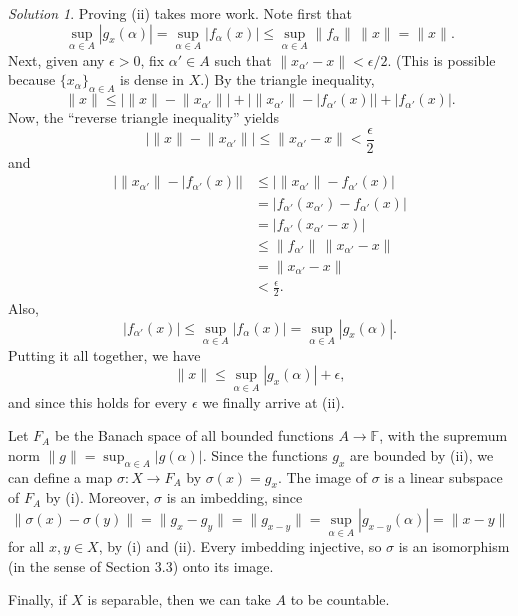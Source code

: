 \documentclass{report}
\newcommand{\bb}[1]{\mathbb{#1}}
\newcommand{\norm}[1]{{\lVert #1 \rVert}}
\theoremstyle{remark}
\newtheorem*{solution}{Solution}
\begin{document}
\begin{solution}
  Proving (ii) takes more work. Note first that
  \begin{equation*}
    \sup_{\alpha \in A} |g_x(\alpha)| = \sup_{\alpha \in A} |f_\alpha(x)| \le \sup_{\alpha \in A} \norm{f_\alpha} \, \norm x = \norm x.
  \end{equation*}
  Next, given any $\epsilon > 0$, fix $\alpha' \in A$ such that $\norm{x_{\alpha'} - x} < \epsilon/2$. (This is possible because $\{x_\alpha\}_{\alpha \in A}$ is dense in $X$.) By the triangle inequality,
  \begin{equation*}
    \norm x \le \big| \norm x - \norm{x_{\alpha'}} \big| + \big| \norm{x_{\alpha'}} - |f_{\alpha'}(x)| \big| + |f_{\alpha'}(x)|.
  \end{equation*}
  Now, the ``reverse triangle inequality'' yields
  \begin{equation*}
    \big| \norm x - \norm{x_{\alpha'}} \big| \le \norm{x_{\alpha'} - x} < \frac{\epsilon}{2}
  \end{equation*}
  and
  \begin{equation*}
    \begin{split}
      \big| \norm{x_{\alpha'}} - |f_{\alpha'}(x)| \big| &\le \big| \norm{x_{\alpha'}} - f_{\alpha'}(x) \big| \\
      &= |f_{\alpha'}(x_{\alpha'}) - f_{\alpha'}(x)| \\
      &= |f_{\alpha'}(x_{\alpha'} - x)| \\
      &\le \norm{f_{\alpha'}} \, \norm{x_{\alpha'} - x} \\
      &= \norm{x_{\alpha'} - x} \\
      &< \frac{\epsilon}{2}.
    \end{split}
  \end{equation*}
  Also,
  \begin{equation*}
    |f_{\alpha'}(x)| \le \sup_{\alpha \in A} |f_\alpha(x)| = \sup_{\alpha \in A} |g_x(\alpha)|.
  \end{equation*}
  Putting it all together, we have
  \begin{equation*}
    \norm x \le \sup_{\alpha \in A} |g_x(\alpha)| + \epsilon,
  \end{equation*}
  and since this holds for every $\epsilon$ we finally arrive at (ii).

  Let $F_A$ be the Banach space of all bounded functions $A \to \bb F$, with the supremum norm $\norm g = \sup_{\alpha \in A} |g(\alpha)|$. Since the functions $g_x$ are bounded by (ii), we can define a map $\sigma: X \to F_A$ by $\sigma(x) = g_x$. The image of $\sigma$ is a linear subspace of $F_A$ by (i). Moreover, $\sigma$ is an imbedding, since
  \begin{equation*}
    \norm{\sigma(x) - \sigma(y)} = \norm{g_x - g_y} = \norm{g_{x-y}} = \sup_{\alpha \in A} |g_{x-y}(\alpha)| = \norm{x - y}
  \end{equation*}
  for all $x,y \in X$, by (i) and (ii). Every imbedding injective, so $\sigma$ is an isomorphism (in the sense of Section 3.3) onto its image.

  Finally, if $X$ is separable, then we can take $A$ to be countable.
\end{solution}
\end{document}

